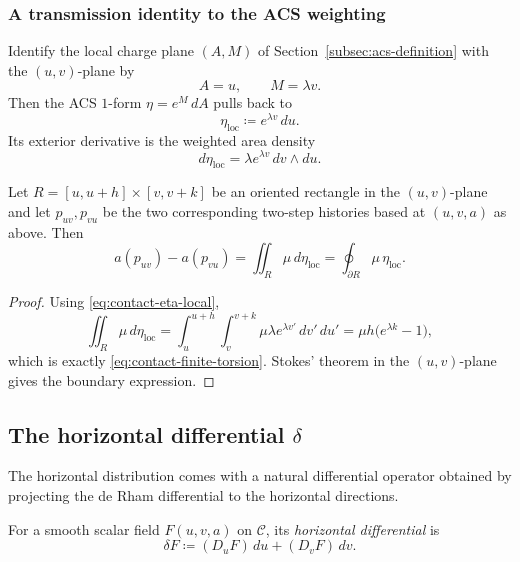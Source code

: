 \subsubsection*{A transmission identity to the ACS weighting}
Identify the local charge plane $(A,M)$ of Section~\ref{subsec:acs-definition} with the $(u,v)$-plane by
\[
A=u,
\qquad
M=\lambda v.
\]
Then the ACS $1$-form $\eta=e^M\,dA$ pulls back to
\[
\eta_{\mathrm{loc}}\coloneqq e^{\lambda v}\,du.
\]
Its exterior derivative is the weighted area density
\begin{equation}\label{eq:contact-eta-local}
d\eta_{\mathrm{loc}}
=\lambda e^{\lambda v}\,dv\wedge du.
\end{equation}

\begin{proposition}\label{prop:contact-acs-bridge}
Let $R=[u,u+h]\times[v,v+k]$ be an oriented rectangle in the $(u,v)$-plane and let $p_{uv},p_{vu}$ be the two corresponding two-step histories based at $(u,v,a)$ as above. Then
\begin{equation}\label{eq:contact-acs-bridge}
a(p_{uv})-a(p_{vu})
=\iint_R \mu\,d\eta_{\mathrm{loc}}
=\oint_{\partial R}\mu\,\eta_{\mathrm{loc}}.
\end{equation}
\end{proposition}

\begin{proof}
Using \eqref{eq:contact-eta-local},
\[
\iint_R \mu\,d\eta_{\mathrm{loc}}
=\int_{u}^{u+h}\int_{v}^{v+k}\mu\lambda e^{\lambda v'}\,dv'\,du'
=\mu h\bigl(e^{\lambda k}-1\bigr),
\]
which is exactly \eqref{eq:contact-finite-torsion}. Stokes' theorem in the $(u,v)$-plane gives the boundary expression.
\end{proof}

\subsection{The horizontal differential \texorpdfstring{$\delta$}{delta}}\label{subsec:contact-delta}

The horizontal distribution comes with a natural differential operator obtained by projecting the de Rham differential to the horizontal directions.

\begin{definition}\label{def:delta}
For a smooth scalar field $F(u,v,a)$ on $\mathcal{C}$, its \emph{horizontal differential} is
\begin{equation}\label{eq:delta-def}
\delta F\coloneqq (D_uF)\,du+(D_vF)\,dv.
\end{equation}
\end{definition}

